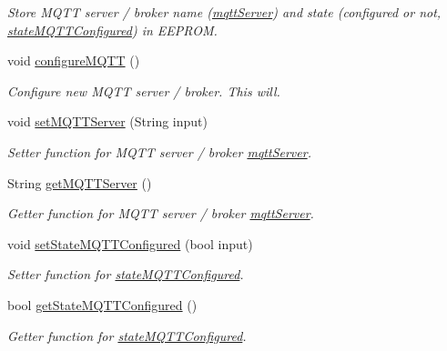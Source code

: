 \begin{DoxyCompactItemize}
\begin{DoxyCompactList}\small\item\em Store M\-Q\-T\-T server / broker name (\hyperlink{WIFIOnOff_8ino_a020889fcca6224d14f4d3f4241ca4467}{mqtt\-Server}) and state (configured or not, \hyperlink{WIFIOnOff_8ino_a3f27c574110acbefe064ca29a7ce289d}{state\-M\-Q\-T\-T\-Configured}) in E\-E\-P\-R\-O\-M. \end{DoxyCompactList}\item 
void \hyperlink{WIFIOnOff_8ino_a3a04a0e88b0687b8c017addfed120950}{configure\-M\-Q\-T\-T} ()
\begin{DoxyCompactList}\small\item\em Configure new M\-Q\-T\-T server / broker. This will. \end{DoxyCompactList}\item 
void \hyperlink{WIFIOnOff_8ino_a104eb4efa9523edca8048af6e38d235f}{set\-M\-Q\-T\-T\-Server} (String input)
\begin{DoxyCompactList}\small\item\em Setter function for M\-Q\-T\-T server / broker \hyperlink{WIFIOnOff_8ino_a020889fcca6224d14f4d3f4241ca4467}{mqtt\-Server}. \end{DoxyCompactList}\item 
String \hyperlink{WIFIOnOff_8ino_a0914c7b7faa1375475836dc6115f1077}{get\-M\-Q\-T\-T\-Server} ()
\begin{DoxyCompactList}\small\item\em Getter function for M\-Q\-T\-T server / broker \hyperlink{WIFIOnOff_8ino_a020889fcca6224d14f4d3f4241ca4467}{mqtt\-Server}. \end{DoxyCompactList}\item 
void \hyperlink{WIFIOnOff_8ino_aad359baa91c446e57ccd6d77ebf49b5d}{set\-State\-M\-Q\-T\-T\-Configured} (bool input)
\begin{DoxyCompactList}\small\item\em Setter function for \hyperlink{WIFIOnOff_8ino_a3f27c574110acbefe064ca29a7ce289d}{state\-M\-Q\-T\-T\-Configured}. \end{DoxyCompactList}\item 
bool \hyperlink{WIFIOnOff_8ino_afc46fe517d2d628cdf59870d4f09060c}{get\-State\-M\-Q\-T\-T\-Configured} ()
\begin{DoxyCompactList}\small\item\em Getter function for \hyperlink{WIFIOnOff_8ino_a3f27c574110acbefe064ca29a7ce289d}{state\-M\-Q\-T\-T\-Configured}. \end{DoxyCompactList}\item 

\end{DoxyCompactItemize}
